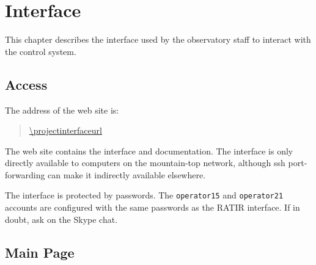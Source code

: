 \chapter{Interface}
\label{chapter:interface}

This chapter describes the interface used by the observatory staff to interact with the {\projectname} control system.

\section{Access}

The address of the {\projectname} web site is:
\begin{quotation}
\url{\projectinterfaceurl}
\end{quotation}

The web site contains the interface and documentation. The interface is only directly available to computers on the mountain-top network, although ssh port-forwarding can make it indirectly available elsewhere.

The interface is protected by passwords. The \verb|operator15| and \verb|operator21| accounts are configured with the same passwords as the RATIR interface. If in doubt, ask on the Skype chat.



\section{Main Page}

